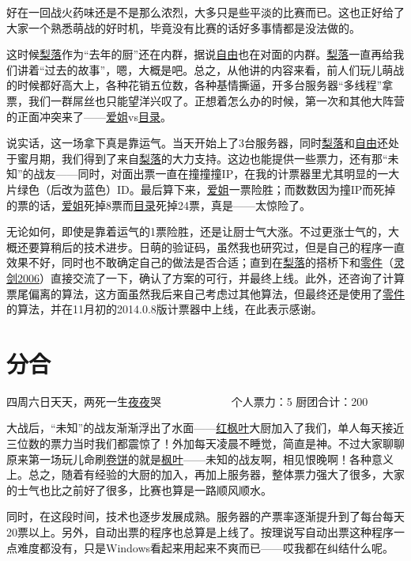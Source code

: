 好在一回战火药味还是不是那么浓烈，大多只是些平淡的比赛而已。这也正好给了大家一个熟悉萌战的好时机，毕竟没有比赛的话好多事情都是没法做的。

这时候\uline{梨落}作为“去年的厨”还在内群，据说\uline{自由}也在对面的内群。\uline{梨落}一直再给我们讲着“过去的故事”，嗯，大概是吧。总之，从他讲的内容来看，前人们玩儿萌战的时候都好高大上，各种花销五位数，各种基情撕逼，开多台服务器“多线程”拿票，我们一群屌丝也只能望洋兴叹了。正想着怎么办的时候，第一次和其他大阵营的正面冲突来了——\uline{爱姐}vs\uline{目录}。

说实话，这一场拿下真是靠运气。当天开始上了3台服务器，同时\uline{梨落}和\uline{自由}还处于蜜月期，我们得到了来自\uline{梨落}的大力支持。这边也能提供一些票力，还有那“未知”的战友——同时，对面出票一直在撞撞撞IP，在我的计票器里尤其明显的一大片绿色（后改为蓝色）ID。最后算下来，\uline{爱姐}一票险胜；而数数因为撞IP而死掉的票的话，\uline{爱姐}死掉8票而\uline{目录}死掉24票，真是——太惊险了。

无论如何，即使是靠着运气的1票险胜，还是让厨士气大涨。不过更涨士气的，大概还要算稍后的技术进步。日萌的验证码，虽然我也研究过，但是自己的程序一直效果不好，同时也不敢确定自己的做法是否合适；直到在\uline{梨落}的搭桥下和\uline{零件}（\uline{灵剑2006}）直接交流了一下，确认了方案的可行，并最终上线。此外，还咨询了计算票尾偏离的算法，这方面虽然我后来自己考虑过其他算法，但最终还是使用了\uline{零件}的算法，并在11月初的2014.0.8版计票器中上线，在此表示感谢。

\chapter{分合}
\begin{center}
{\subTitle 四周六日天天，两死一生\uline{夜夜}哭}
\subMemo
　　　　　　个人票力：5 厨团合计：200
\end{center}

大战后，“未知”的战友渐渐浮出了水面——\uline{红枫叶}大厨加入了我们，单人每天接近三位数的票力当时我们都震惊了！外加每天凌晨不睡觉，简直是神。不过大家聊聊原来第一场玩儿命刷\uline{卷饼}的就是\uline{枫叶}——未知的战友啊，相见恨晚啊！各种意义上。总之，随着有经验的大厨的加入，再加上服务器，整体票力强大了很多，大家的士气也比之前好了很多，比赛也算是一路顺风顺水。

同时，在这段时间，技术也逐步发展成熟。服务器的产票率逐渐提升到了每台每天20票以上。另外，自动出票的程序也总算是上线了。按理说写自动出票这种程序一点难度都没有，只是Windows看起来用起来不爽而已——哎我都在纠结什么呢。

